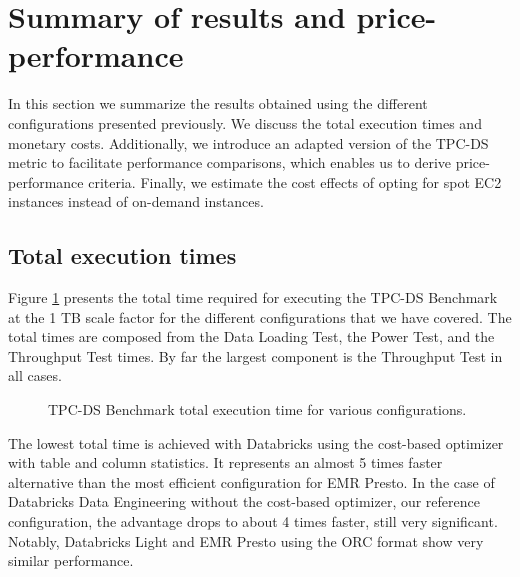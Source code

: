 \section{Summary of results and price-performance}\label{resultsSummary}

In this section we summarize the results obtained using the different configurations presented previously. We discuss the total execution times and monetary costs. Additionally, we introduce an adapted version of the TPC-DS metric to facilitate performance comparisons, which enables us to derive price-performance criteria. Finally, we estimate the cost effects of opting for spot EC2 instances instead of on-demand instances.

\subsection{Total execution times}\label{resultsSummaryTotalExecutionTimes}

Figure \ref{fig:resultsSummaryTotalTimes} presents the total time required for executing the TPC-DS Benchmark at the 1 TB scale factor for the different configurations that we have covered. The total times are composed from the Data Loading Test, the Power Test, and the Throughput Test times. By far the largest component is the Throughput Test in all cases.

\begin{figure}
   \begin{center}
   \end{center}
   \caption{TPC-DS Benchmark total execution time for various configurations.}
   \label{fig:resultsSummaryTotalTimes}
\end{figure}

The lowest total time is achieved with Databricks using the cost-based optimizer with table and column statistics. It represents an almost 5 times faster alternative than the most efficient configuration for EMR Presto. In the case of Databricks Data Engineering without the cost-based optimizer, our reference configuration, the advantage drops to about 4 times faster, still very significant. Notably, Databricks Light and EMR Presto using the ORC format show very similar performance.

